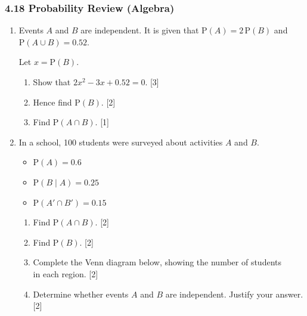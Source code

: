 \documentclass[12pt, twoside]{article}
\begin{document}
\subsubsection*{4.18 Probability Review (Algebra)}

\begin{enumerate}[itemsep=0.15cm]

\item Events $A$ and $B$ are independent. It is given that
      $\mathrm{P}(A) = 2\,\mathrm{P}(B)$ and $\mathrm{P}(A \cup B) = 0.52$.

      Let $x = \mathrm{P}(B)$.

\begin{enumerate}[itemsep=0.1cm]
  \item Show that $2x^{2} - 3x + 0.52 = 0$. \hfill [3]
  \item Hence find $\mathrm{P}(B)$. \hfill [2]
  \item Find $\mathrm{P}(A \cap B)$. \hfill [1]
\end{enumerate}


\newpage

\item In a school, 100 students were surveyed about activities $A$ and $B$.

\begin{itemize}[itemsep=0.1cm]
  \item $\mathrm{P}(A) = 0.6$
  \item $\mathrm{P}(B \mid A) = 0.25$
  \item $\mathrm{P}(A' \cap B') = 0.15$
\end{itemize}

\begin{enumerate}[itemsep=0.1cm]
  \item Find $\mathrm{P}(A \cap B)$. \hfill [2]
  \item Find $\mathrm{P}(B)$. \hfill [2]
  \item Complete the Venn diagram below, showing the number
        of students \\in each region. \hfill [2]
  \item Determine whether events $A$ and $B$ are independent.
        Justify your answer. \hfill [2]
\end{enumerate}


\end{enumerate}
\end{document}
